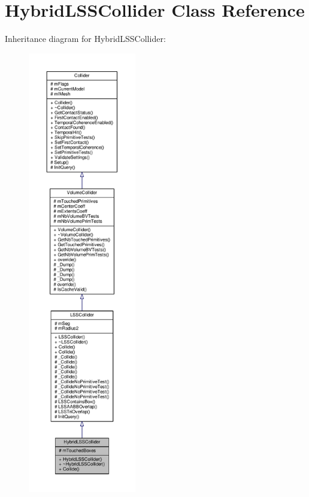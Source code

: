 \hypertarget{classHybridLSSCollider}{}\section{Hybrid\+L\+S\+S\+Collider Class Reference}
\label{classHybridLSSCollider}


Inheritance diagram for Hybrid\+L\+S\+S\+Collider\+:
\nopagebreak
\begin{figure}[H]
\begin{center}
\leavevmode
\includegraphics[height=550pt]{d6/d0b/classHybridLSSCollider__inherit__graph}
\end{center}
\end{figure}


